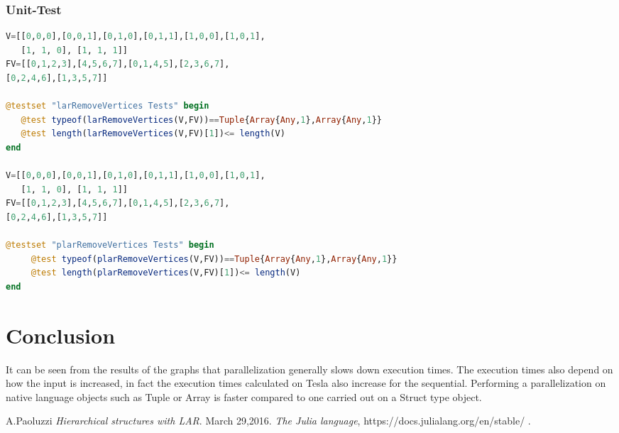 \documentclass[a4paper,12pt]{article}
\begin{document}
\subsubsection{Unit-Test}
\begin{lstlisting}[language=Julia]
V=[[0,0,0],[0,0,1],[0,1,0],[0,1,1],[1,0,0],[1,0,1],
   [1, 1, 0], [1, 1, 1]]
FV=[[0,1,2,3],[4,5,6,7],[0,1,4,5],[2,3,6,7], 
[0,2,4,6],[1,3,5,7]]

@testset "larRemoveVertices Tests" begin
   @test typeof(larRemoveVertices(V,FV))==Tuple{Array{Any,1},Array{Any,1}}
   @test length(larRemoveVertices(V,FV)[1])<= length(V)
end

V=[[0,0,0],[0,0,1],[0,1,0],[0,1,1],[1,0,0],[1,0,1],
   [1, 1, 0], [1, 1, 1]]
FV=[[0,1,2,3],[4,5,6,7],[0,1,4,5],[2,3,6,7], 
[0,2,4,6],[1,3,5,7]]

@testset "plarRemoveVertices Tests" begin
	 @test typeof(plarRemoveVertices(V,FV))==Tuple{Array{Any,1},Array{Any,1}}
	 @test length(plarRemoveVertices(V,FV)[1])<= length(V)
end
\end{lstlisting}
\section{Conclusion}
It can be seen from the results of the graphs that parallelization generally slows down execution times. The execution times also depend on how the input is increased, in fact the execution times calculated on Tesla also increase for the sequential. Performing a parallelization on native language objects such as Tuple or Array is faster compared to one carried out on a Struct type object.


\begin{thebibliography}{9}
 A.Paoluzzi
\emph{Hierarchical structures with LAR}.
March 29,2016.
\emph{The Julia language}, https://docs.julialang.org/en/stable/
.\end{thebibliography}
\end{document}
